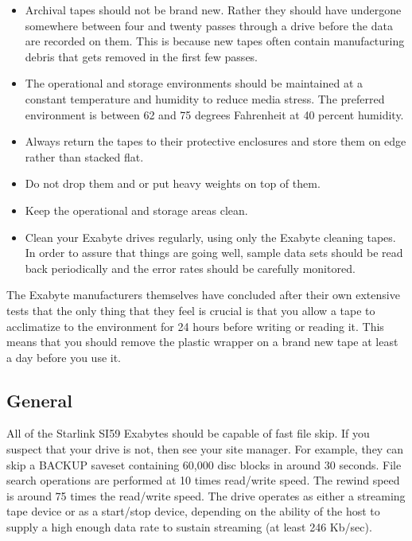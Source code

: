 \begin{itemize}

\item Archival tapes should not be brand new.  Rather they should have
undergone somewhere between four and twenty passes through a drive before the
data are recorded on them.  This is because new tapes often contain
manufacturing debris that gets removed in the first few passes.


\item The operational and storage environments should be maintained at a
constant temperature and humidity to reduce media stress.  The preferred
environment is between 62 and 75 degrees Fahrenheit at 40 percent humidity.

\item Always return the tapes to their protective enclosures and store them on
edge rather than stacked flat.

\item Do not drop them and or put heavy weights on top of them.

\item Keep the operational and storage areas clean.

\item Clean your Exabyte drives regularly, using only the Exabyte cleaning
tapes.  In order to assure that things are going well, sample data sets should
be read back periodically and the error rates should be carefully monitored.

\end{itemize}

The Exabyte manufacturers themselves have concluded after their own extensive
tests that the only thing that they feel is crucial is that you allow a tape to
acclimatize to the environment for 24 hours before writing or reading it.  This
means that you should remove the plastic wrapper on a brand new tape at least a
day before you use it.



\subsection{General}

All of the Starlink SI59 Exabytes should be capable of fast file skip.
If you suspect that your drive is not, then see your site manager.
For example, they
can skip a BACKUP saveset containing 60,000 disc blocks in around 30 seconds.
File search operations are performed at 10 times read/write speed.
The rewind speed is around 75 times the read/write speed.
The drive operates as either a streaming tape device or as a start/stop
device, depending on the ability of the host to supply a high enough
data rate to sustain streaming (at least 246 Kb/sec).

